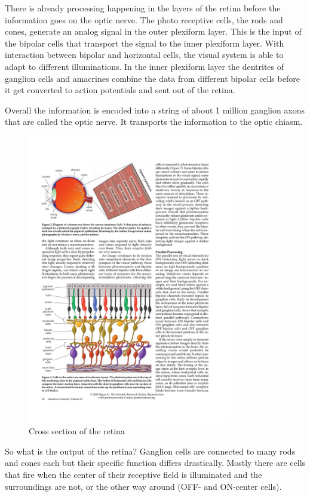 		There is already processing happening in the layers of the retina before the information goes on the optic nerve. The photo receptive cells, the rods and cones, generate an analog signal in the outer plexiform layer. This is the input of the bipolar cells that transport the signal to the inner plexiform layer. With interaction between bipolar and horizontal cells, the visual system is able to adapt to different illuminations. In the inner plexiform layer the dentrites of ganglion cells and amacrines combine the data from different bipolar cells before it get converted to action potentials and sent out of the retina.
		
		Overall the information is encoded into a string of about 1 million ganglion axons that are called the optic nerve. It transports the information to the optic chiasm.
		
		\begin{figure}[H]
			\centering
			\includegraphics[width=0.8\textwidth, trim=1cm 5cm 8cm 15cm, clip]{images/kolb-2003-howtheretinaworks-p3.pdf}
			\caption{Cross section of the retina \citep{kolb2003retina}}
		\end{figure}
		
		So what is the output of the retina? Ganglion cells are connected to many rods and cones each but their specific function differs drastically. Mostly there are cells that fire when the center of their receptive field is illuminated and the surroundings are not, or the other way around (OFF- and ON-center cells).
		
